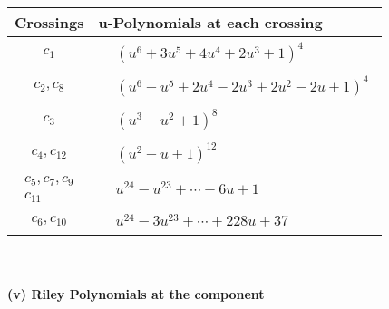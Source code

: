\documentclass[1p]{elsarticle_modified}
\theoremstyle{definition}
\begin{document}
\begin{tabular}{m{50pt}|m{274pt}}
Crossings & \hspace{64pt}u-Polynomials at each crossing \\
\hline $$\begin{aligned}c_{1}\end{aligned}$$&$\begin{aligned}
&(u^6+3 u^5+4 u^4+2 u^3+1)^4
\end{aligned}$\\
\hline $$\begin{aligned}c_{2},c_{8}\end{aligned}$$&$\begin{aligned}
&(u^6- u^5+2 u^4-2 u^3+2 u^2-2 u+1)^4
\end{aligned}$\\
\hline $$\begin{aligned}c_{3}\end{aligned}$$&$\begin{aligned}
&(u^3- u^2+1)^8
\end{aligned}$\\
\hline $$\begin{aligned}c_{4},c_{12}\end{aligned}$$&$\begin{aligned}
&(u^2- u+1)^{12}
\end{aligned}$\\
\hline $$\begin{aligned}c_{5},c_{7},c_{9}\\c_{11}\end{aligned}$$&$\begin{aligned}
&u^{24}- u^{23}+\cdots-6 u+1
\end{aligned}$\\
\hline $$\begin{aligned}c_{6},c_{10}\end{aligned}$$&$\begin{aligned}
&u^{24}-3 u^{23}+\cdots+228 u+37
\end{aligned}$\\
\hline
\end{tabular}\\~\\
\newpage\renewcommand{\arraystretch}{1}
\flushleft \textbf{(v) Riley Polynomials at the component}\newline \\
\end{document}
